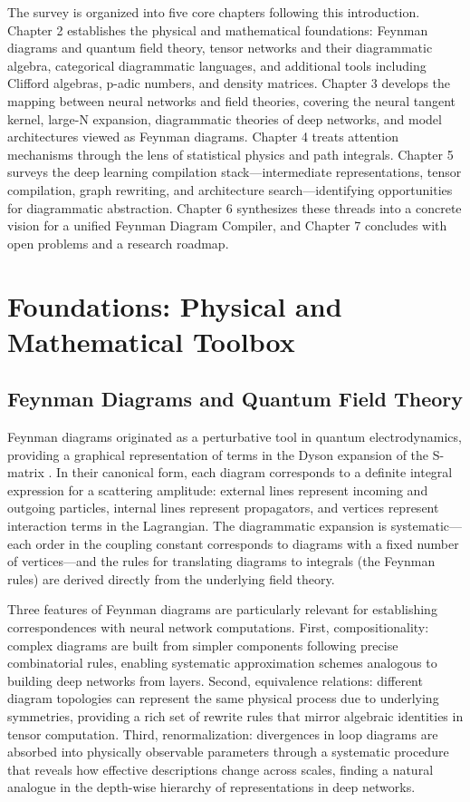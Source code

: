 \documentclass[12pt,a4paper]{article}
\begin{document}
The survey is organized into five core chapters following this introduction. Chapter 2 establishes the physical and mathematical foundations: Feynman diagrams and quantum field theory, tensor networks and their diagrammatic algebra, categorical diagrammatic languages, and additional tools including Clifford algebras, p-adic numbers, and density matrices. Chapter 3 develops the mapping between neural networks and field theories, covering the neural tangent kernel, large-N expansion, diagrammatic theories of deep networks, and model architectures viewed as Feynman diagrams. Chapter 4 treats attention mechanisms through the lens of statistical physics and path integrals. Chapter 5 surveys the deep learning compilation stack---intermediate representations, tensor compilation, graph rewriting, and architecture search---identifying opportunities for diagrammatic abstraction. Chapter 6 synthesizes these threads into a concrete vision for a unified Feynman Diagram Compiler, and Chapter 7 concludes with open problems and a research roadmap.

\section{Foundations: Physical and Mathematical Toolbox}
\subsection{Feynman Diagrams and Quantum Field Theory}

Feynman diagrams originated as a perturbative tool in quantum electrodynamics, providing a graphical representation of terms in the Dyson expansion of the S-matrix \cite{feynman2020feynman, weinzierl2022feynman}. In their canonical form, each diagram corresponds to a definite integral expression for a scattering amplitude: external lines represent incoming and outgoing particles, internal lines represent propagators, and vertices represent interaction terms in the Lagrangian. The diagrammatic expansion is systematic---each order in the coupling constant corresponds to diagrams with a fixed number of vertices---and the rules for translating diagrams to integrals (the Feynman rules) are derived directly from the underlying field theory.

Three features of Feynman diagrams are particularly relevant for establishing correspondences with neural network computations. First, compositionality: complex diagrams are built from simpler components following precise combinatorial rules, enabling systematic approximation schemes analogous to building deep networks from layers. Second, equivalence relations: different diagram topologies can represent the same physical process due to underlying symmetries, providing a rich set of rewrite rules that mirror algebraic identities in tensor computation. Third, renormalization: divergences in loop diagrams are absorbed into physically observable parameters through a systematic procedure that reveals how effective descriptions change across scales, finding a natural analogue in the depth-wise hierarchy of representations in deep networks.
\end{document}
